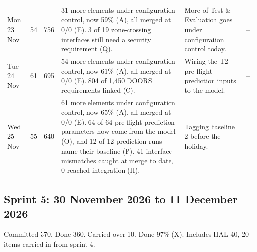 \documentclass[12pt,letterpaper,oneside]{article}
\begin{document}
{\begin{longtable}{@{}>{\raggedright}p{} r r >{\raggedright}p{} >{\raggedright}p{} >{\raggedright\arraybackslash}p{}@{}}
Mon 23 Nov & 54 & 756 & 31 more elements under configuration control, now 59\% (A), all merged at 0/0 (E). 3 of 19 zone-crossing interfaces still need a security requirement (Q). & More of Test \& Evaluation goes under configuration control today. & -- \\
Tue 24 Nov & 61 & 695 & 54 more elements under configuration control, now 61\% (A), all merged at 0/0 (E). 804 of 1,450 DOORS requirements linked (C). & Wiring the T2 pre-flight prediction inputs to the model. & -- \\
Wed 25 Nov & 55 & 640 & 61 more elements under configuration control, now 65\% (A), all merged at 0/0 (E). 64 of 64 pre-flight prediction parameters now come from the model (O), and 12 of 12 prediction runs name their baseline (P). 41 interface mismatches caught at merge to date, 0 reached integration (H). & Tagging baseline 2 before the holiday. & -- \\
\end{longtable}}
\subsection{Sprint 5: 30 November 2026 to 11 December 2026}
Committed 370. Done 360. Carried over 10. Done 97\% (X). Includes HAL-40, 20 items carried in from sprint 4.
\end{document}
